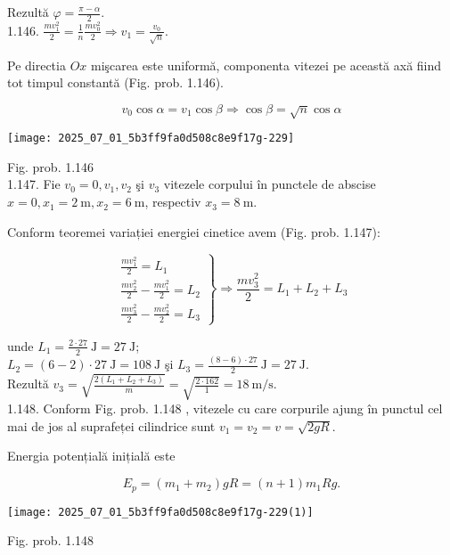Rezultă $\varphi=\frac{\pi-\alpha}{2}$.\\
1.146. $\frac{m v_{1}^{2}}{2}=\frac{1}{n} \frac{m v_{0}^{2}}{2} \Rightarrow v_{1}=\frac{v_{0}}{\sqrt{n}}$.

Pe directia $O x$ mişcarea este uniformă, componenta vitezei pe această axă fiind tot timpul constantă (Fig. prob. 1.146).

$$
v_{0} \cos \alpha=v_{1} \cos \beta \Rightarrow \cos \beta=\sqrt{n} \cos \alpha
$$

\begin{center}
\texttt{[image: 2025\_07\_01\_5b3ff9fa0d508c8e9f17g-229]}
\end{center}

Fig. prob. 1.146\\
1.147. Fie $v_{0}=0, v_{1}, v_{2}$ şi $v_{3}$ vitezele corpului în punctele de abscise $x=0, x_{1}=2 \mathrm{~m}, x_{2}=6 \mathrm{~m}$, respectiv $x_{3}=8 \mathrm{~m}$.

Conform teoremei variației energiei cinetice avem (Fig. prob. 1.147):

$$
\left.\begin{array}{l}
\frac{m v_{1}^{2}}{2}=L_{1} \\
\frac{m v_{2}^{2}}{2}-\frac{m v_{1}^{2}}{2}=L_{2} \\
\frac{m v_{3}^{2}}{2}-\frac{m v_{2}^{2}}{2}=L_{3}
\end{array}\right\} \Rightarrow \frac{m v_{3}^{2}}{2}=L_{1}+L_{2}+L_{3}
$$

unde $L_{1}=\frac{2 \cdot 27}{2} \mathrm{~J}=27 \mathrm{~J}$;\\
$L_{2}=(6-2) \cdot 27 \mathrm{~J}=108 \mathrm{~J}$ şi $L_{3}=\frac{(8-6) \cdot 27}{2} \mathrm{~J}=27 \mathrm{~J}$.\\
Rezultă $v_{3}=\sqrt{\frac{2\left(L_{1}+L_{2}+L_{3}\right)}{m}}=\sqrt{\frac{2 \cdot 162}{1}}=18 \mathrm{~m} / \mathrm{s}$.\\
1.148. Conform Fig. prob. 1.148 , vitezele cu care corpurile ajung în punctul cel mai de jos al suprafeței cilindrice sunt $v_{1}=v_{2}=v=\sqrt{2 g R}$.

Energia potențială inițială este

$$
E_{p}=\left(m_{1}+m_{2}\right) g R=(n+1) m_{1} R g .
$$

\begin{center}
\texttt{[image: 2025\_07\_01\_5b3ff9fa0d508c8e9f17g-229(1)]}
\end{center}

Fig. prob. 1.148

